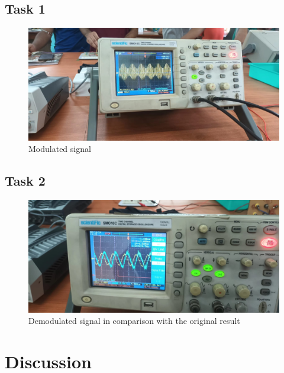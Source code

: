 \documentclass{article}
\begin{document}
\subsection{Task 1}
\begin{figure}[!ht]
  \caption{Modulated signal}
\includegraphics[width=\textwidth]{Modulated_signal.jpg}
\end{figure}
\newpage
\subsection{Task 2}
\begin{figure}[!ht]
  \caption{Demodulated signal in comparison with the original result}
  \includegraphics[width=\textwidth]{Demodulation_result.jpg}
\end{figure}


\section{Discussion}
\end{document}
